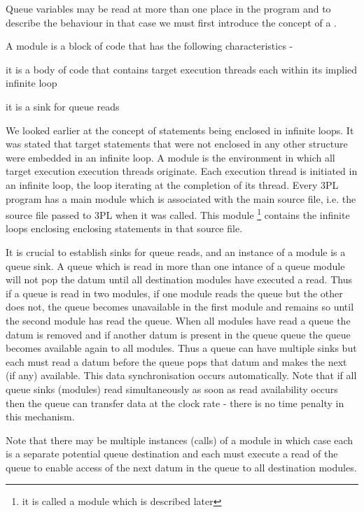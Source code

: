         Queue variables may be read at more than one place in the program and to
        describe the behaviour in that case we must first introduce the concept of a
        .

        A module is a block of code that has the following characteristics -
        \blist
        \item   it is a body of code that contains target execution threads
                each within its implied infinite loop
        \item   it is a sink for queue reads
        \blend

        We looked earlier at the concept of statements being enclosed in infinite
        loops. It was stated that target statements that were not enclosed in any other
        structure were embedded in an infinite loop. A module is the environment in
        which all target execution execution threads originate. Each execution thread
        is initiated in an infinite loop, the loop iterating at the completion of its
        thread. Every 3PL program has a main module which is associated with the main
        source file, i.e. the source file passed to 3PL when it was called. This module
        \footnote{it is called a  module which is described later} contains the
        infinite loops enclosing enclosing statements in that source file.

        It is crucial to establish sinks for queue reads, and an instance of a
        module is a queue sink. A queue which is read in more than one intance of a
        queue module will not pop the datum until all destination modules have
        executed a read. Thus if a queue is read in two modules, if one module reads
        the queue but the other does not, the queue becomes unavailable in the
        first module and remains so until the second module has read the queue.
        When all modules have read a queue the datum is removed and if another
        datum is present in the queue queue the queue becomes available again to
        all modules. Thus a queue can have multiple sinks but each must read a
        datum before the queue pops that datum and makes the next (if any)
        available. This data synchronisation occurs automatically. Note that if all
        queue sinks (modules) read simultaneously as soon as read availability
        occurs then the queue can transfer data at the clock rate - there is no
        time penalty in this mechanism.
        
        Note that there may be multiple instances (calls) of a module in which case
        each is a separate potential queue destination and each must execute a read
        of the queue to enable access of the next datum in the queue to all
        destination modules.

